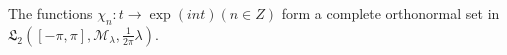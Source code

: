 The functions $\chi_n: t \to \exp(int) (n \in Z)$ form a complete orthonormal set in $\mathfrak{L}_2 \left( [-\pi, \pi], \mathcal{M}_{\lambda}, \frac{1}{2\pi} \lambda \right)$.